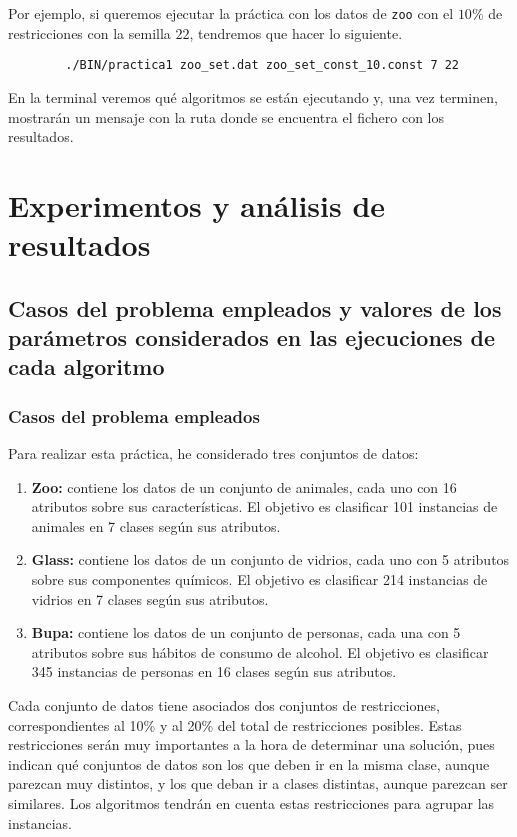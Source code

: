 			Por ejemplo, si queremos ejecutar la práctica con los datos de \lstinline!zoo! con el $10$\% de restricciones con la semilla $22$,
			tendremos que hacer lo siguiente.

		\begin{lstlisting}
		./BIN/practica1 zoo_set.dat zoo_set_const_10.const 7 22 
		\end{lstlisting}

			En la terminal veremos qué algoritmos se están ejecutando y, una vez terminen, mostrarán un mensaje con la ruta donde se encuentra 
			el fichero con los resultados.
\newpage

\section{Experimentos y análisis de resultados}


\subsection{Casos del problema empleados y valores de los parámetros considerados en las ejecuciones de cada algoritmo}

\subsubsection{Casos del problema empleados}

Para realizar esta práctica, he considerado tres conjuntos de datos:

\begin{enumerate}
	\item \textbf{Zoo:} contiene los datos de un conjunto de animales, cada uno con 16 atributos sobre sus características. 
	El objetivo es clasificar 101 instancias de animales en 7 clases según sus atributos.
	\item \textbf{Glass:} contiene los datos de un conjunto de vidrios, cada uno con 5 atributos sobre sus componentes químicos.
	El objetivo es clasificar 214 instancias de vidrios en 7 clases según sus atributos.
	\item \textbf{Bupa:} contiene los datos de un conjunto de personas, cada una con 5 atributos sobre sus hábitos de consumo de alcohol.
	El objetivo es clasificar 345 instancias de personas en 16 clases según sus atributos.
\end{enumerate}

Cada conjunto de datos tiene asociados dos conjuntos de restricciones, correspondientes al 10\% y al 20\% 
del total de restricciones posibles. Estas restricciones serán muy importantes a la hora de determinar una solución,
pues indican qué conjuntos de datos son los que deben ir en la misma clase, aunque parezcan muy distintos, y los que deban ir a clases distintas, aunque parezcan ser similares.
Los algoritmos tendrán en cuenta estas restricciones para agrupar las instancias.

